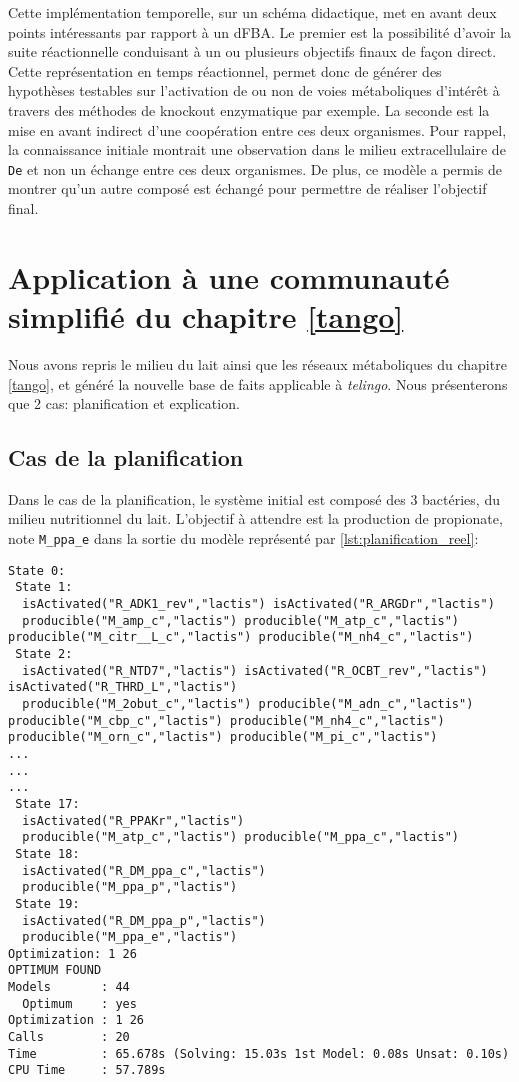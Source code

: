\documentclass[../main.tex]{subfiles}
\begin{document}
    
Cette implémentation temporelle, sur un schéma didactique, met en avant deux points intéressants par rapport à un dFBA. Le premier est la possibilité d'avoir la suite réactionnelle conduisant à un ou plusieurs objectifs finaux de façon direct. Cette représentation en temps réactionnel, permet donc de générer des hypothèses testables sur l'activation de ou non de voies métaboliques d'intérêt à travers des méthodes de knockout enzymatique par exemple. La seconde est la mise en avant indirect d'une coopération entre ces deux organismes. Pour rappel, la connaissance initiale montrait une observation dans le milieu extracellulaire de \texttt{De} et non un échange entre ces deux organismes. De plus, ce modèle a permis de montrer qu'un autre composé est échangé pour permettre de réaliser l'objectif final.
    
    
\section{Application à une communauté simplifié du chapitre \ref{tango}}
Nous avons repris le milieu du lait ainsi que les réseaux métaboliques du chapitre \ref{tango}, et généré la nouvelle base de faits applicable à \textit{telingo}. Nous présenterons que 2 cas: planification et explication.  \\

\subsection{Cas de la planification}
Dans le cas de la planification, le système initial est composé des 3 bactéries, du milieu nutritionnel du lait. L'objectif à attendre est la production de propionate, note \texttt{M\_ppa\_e} dans la sortie du modèle représenté par \ref{lst:planification_reel}:

\begin{lstlisting}[label = lst:planification_reel , caption = Résultat de la planification obtenue après application des règles sur la base de faits issue des données réelles]
 State 0:
 State 1:
  isActivated("R_ADK1_rev","lactis") isActivated("R_ARGDr","lactis")
  producible("M_amp_c","lactis") producible("M_atp_c","lactis") producible("M_citr__L_c","lactis") producible("M_nh4_c","lactis")
 State 2:
  isActivated("R_NTD7","lactis") isActivated("R_OCBT_rev","lactis") isActivated("R_THRD_L","lactis")
  producible("M_2obut_c","lactis") producible("M_adn_c","lactis") producible("M_cbp_c","lactis") producible("M_nh4_c","lactis") producible("M_orn_c","lactis") producible("M_pi_c","lactis")
...
...
...
 State 17:
  isActivated("R_PPAKr","lactis")
  producible("M_atp_c","lactis") producible("M_ppa_c","lactis")
 State 18:
  isActivated("R_DM_ppa_c","lactis")
  producible("M_ppa_p","lactis")
 State 19:
  isActivated("R_DM_ppa_p","lactis")
  producible("M_ppa_e","lactis")
Optimization: 1 26
OPTIMUM FOUND
Models       : 44
  Optimum    : yes
Optimization : 1 26
Calls        : 20
Time         : 65.678s (Solving: 15.03s 1st Model: 0.08s Unsat: 0.10s)
CPU Time     : 57.789s
\end{lstlisting}
\end{document}
